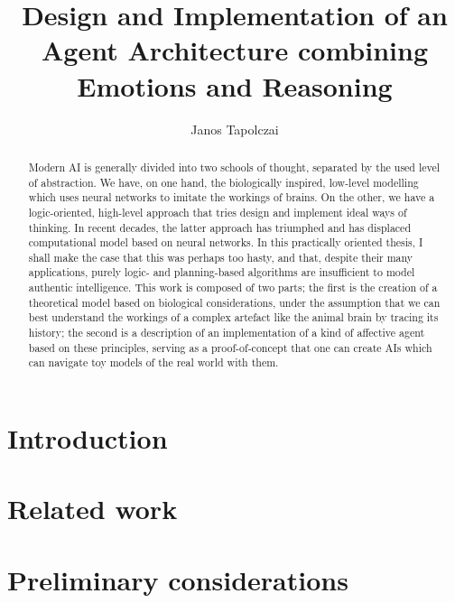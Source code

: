 \documentclass[bibliography=totoc ]{scrartcl}
\title{{\huge Design and Implementation of an Agent Architecture combining Emotions and Reasoning}}
\author{Janos Tapolczai}
\begin{document}
\maketitle


\begin{abstract}
Modern AI is generally divided into two schools of thought, separated by the used level of abstraction. We have, on one hand, the biologically inspired, low-level modelling which uses neural networks to imitate the workings of brains. On the other, we have a logic-oriented, high-level approach that tries design and implement ideal ways of thinking. In recent decades, the latter approach has triumphed and has displaced computational model based on neural networks. In this practically oriented thesis, I shall make the case that this was perhaps too hasty, and that, despite their many applications, purely logic- and planning-based algorithms are insufficient to model authentic intelligence. This work is composed of two parts; the first is the creation of a theoretical model based on biological considerations, under the assumption that we can best understand the workings of a complex artefact like the animal brain by tracing its history; the second is a description of an implementation of a kind of affective agent based on these principles, serving as a proof-of-concept that one can create AIs which can navigate toy models of the real world with them.
\end{abstract}

\newpage

\hypersetup{linkcolor=black}
\tableofcontents
\hypersetup{linkcolor=DeepBlue}
\newpage

\begingroup
\let\clearpage\relax

\section{Introduction}



\section{Related work}\label{sec:relatedWork}



\section{Preliminary considerations}\label{sec:preliminaries}
\end{document}
